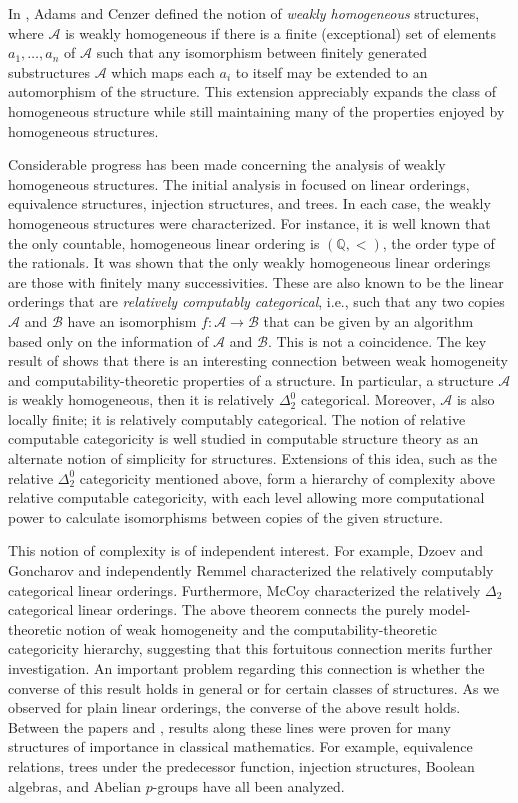 \documentclass[11pt]{amsart}
\theoremstyle{definition}
\def\A{\mathcal A}
\def\B{\mathcal{B}}
\begin{document}
In \cite{AC17}, Adams and Cenzer defined the notion of \emph{weakly homogeneous} structures,
where $\A$ is weakly homogeneous if there is a
finite (exceptional) set of elements $a_1,\dots,a_n$ of $\A$ such that any isomorphism between finitely generated substructures $\A$ which maps each $a_i$ to itself may be extended to an automorphism of the structure. 
This extension appreciably expands the class of homogeneous structure while still maintaining many of the properties enjoyed by homogeneous structures.

Considerable progress has been made concerning the analysis of weakly homogeneous structures.
The initial analysis in \cite{AC17} focused on linear orderings, equivalence structures, injection structures, and trees.
In each case, the weakly homogeneous structures were characterized.
For instance, it is well known that the only countable, homogeneous linear ordering is $(\mathbb{Q},<)$, the order type of the rationals. It was shown that the only weakly homogeneous linear orderings are those with finitely many successivities.
These are also known to be the linear orderings that are \textit{relatively computably categorical}, i.e., such that any two copies $\A$ and $\B$ have an isomorphism $f:\A\to\B$ that can be given by an algorithm based only on the information of $\A$ and $\B$.
This is not a coincidence.
The key result of \cite{AC17} shows that there is an interesting connection between weak homogeneity and computability-theoretic properties of a structure.
In particular, a structure $\A$ is weakly homogeneous, then it is relatively $\Delta^0_2$ categorical.
Moreover, $\A$ is also locally finite; it is relatively computably categorical.
The notion of relative computable categoricity is well studied in computable structure theory as an alternate notion of simplicity for structures.
Extensions of this idea, such as the relative $\Delta_2^0$ categoricity mentioned above, form a hierarchy of complexity above relative computable categoricity, with each level allowing more computational power to calculate isomorphisms between copies of the given structure.

This notion of complexity is of independent interest.
For example, Dzoev and Goncharov \cite{DG1980}  and independently Remmel \cite{Rem81} characterized the relatively computably categorical linear orderings. Furthermore, McCoy \cite{McCoy2003} characterized the relatively $\Delta_2$ categorical linear orderings.
The above theorem connects the purely model-theoretic notion of weak homogeneity and the computability-theoretic categoricity hierarchy, suggesting that this fortuitous connection merits further investigation.
An important problem regarding this connection is whether the converse of this result holds in general or for certain classes of structures.
As we observed for plain linear orderings, the converse of the above result holds.
Between the papers \cite{AC17} and \cite{ACN20}, results along these lines were proven for many structures of importance in classical mathematics.
For example, equivalence relations, trees under the predecessor function, injection structures, Boolean algebras, and Abelian $p$-groups have all been analyzed.
\end{document}

